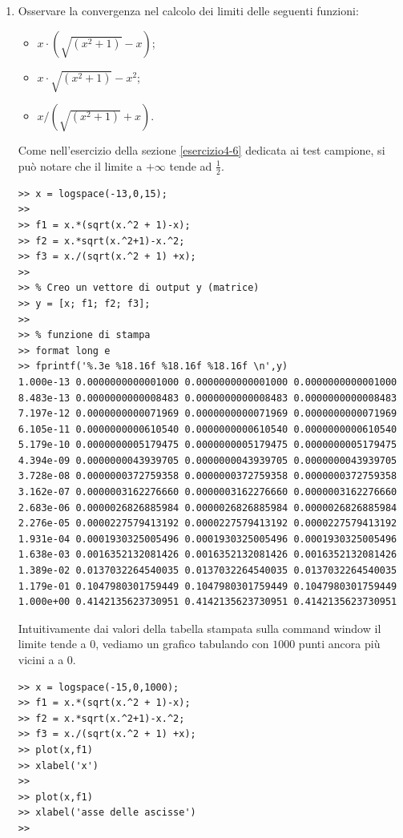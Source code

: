 \begin{enumerate}
\item Osservare la convergenza nel calcolo dei limiti delle seguenti
funzioni:
\begin{itemize}
\item $x \cdot (\sqrt{(x^2+1)}-x)$;
\item $x \cdot \sqrt{(x^2+1)}-x^2$;
\item $x / (\sqrt{(x^2+1)}+x)$.
\end{itemize}

\begin{svol}
Come nell'esercizio della sezione \ref{esercizio4-6} dedicata ai test
campione, si può notare che il limite a $+\infty$ tende ad $\frac{1}{2}$.
\begin{codice}
\begin{verbatim}
>> x = logspace(-13,0,15);
>> 
>> f1 = x.*(sqrt(x.^2 + 1)-x);
>> f2 = x.*sqrt(x.^2+1)-x.^2;
>> f3 = x./(sqrt(x.^2 + 1) +x);
>> 
>> % Creo un vettore di output y (matrice)
>> y = [x; f1; f2; f3];
>> 
>> % funzione di stampa
>> format long e
>> fprintf('%.3e %18.16f %18.16f %18.16f \n',y)
1.000e-13 0.0000000000001000 0.0000000000001000 0.0000000000001000 
8.483e-13 0.0000000000008483 0.0000000000008483 0.0000000000008483 
7.197e-12 0.0000000000071969 0.0000000000071969 0.0000000000071969 
6.105e-11 0.0000000000610540 0.0000000000610540 0.0000000000610540 
5.179e-10 0.0000000005179475 0.0000000005179475 0.0000000005179475 
4.394e-09 0.0000000043939705 0.0000000043939705 0.0000000043939705 
3.728e-08 0.0000000372759358 0.0000000372759358 0.0000000372759358 
3.162e-07 0.0000003162276660 0.0000003162276660 0.0000003162276660 
2.683e-06 0.0000026826885984 0.0000026826885984 0.0000026826885984 
2.276e-05 0.0000227579413192 0.0000227579413192 0.0000227579413192 
1.931e-04 0.0001930325005496 0.0001930325005496 0.0001930325005496 
1.638e-03 0.0016352132081426 0.0016352132081426 0.0016352132081426 
1.389e-02 0.0137032264540035 0.0137032264540035 0.0137032264540035 
1.179e-01 0.1047980301759449 0.1047980301759449 0.1047980301759449 
1.000e+00 0.4142135623730951 0.4142135623730951 0.4142135623730951 
\end{verbatim}
\end{codice}
Intuitivamente dai valori della tabella stampata sulla command window il limite
tende a $0$, vediamo un grafico tabulando con $1000$ punti ancora più
vicini a a $0$.
\begin{codice}
\begin{verbatim}
>> x = logspace(-15,0,1000);
>> f1 = x.*(sqrt(x.^2 + 1)-x);
>> f2 = x.*sqrt(x.^2+1)-x.^2;
>> f3 = x./(sqrt(x.^2 + 1) +x);
>> plot(x,f1)
>> xlabel('x')
>> 
>> plot(x,f1)
>> xlabel('asse delle ascisse')
>> 
\end{verbatim}
\end{codice}


\end{svol}
\end{enumerate}

